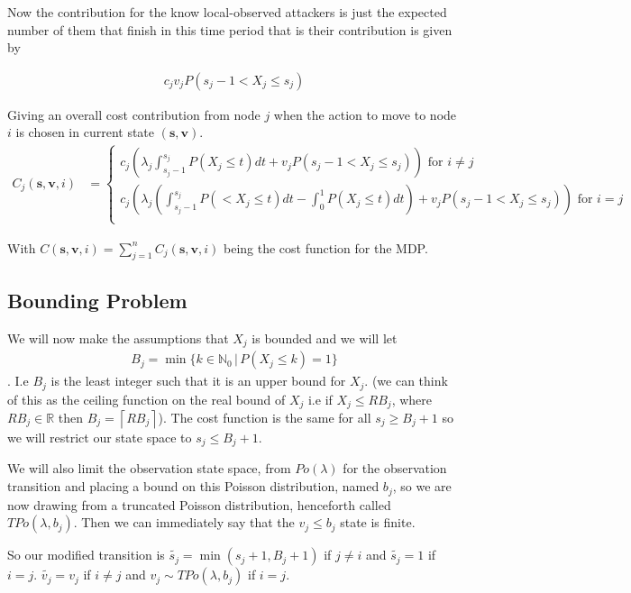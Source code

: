\documentclass[a4paper,10pt]{article}
\newcommand{\ceil}[1]{\left \lceil #1 \right \rceil}
\theoremstyle{definition}
\theoremstyle{definition}
\theoremstyle{remark}
\theoremstyle{definition}
\begin{document}
Now the contribution for the know local-observed attackers is just the expected number of them that finish in this time period that is their contribution is given by

\begin{align*}
c_{j} v_{j} P(s_{j}-1 < X_{j} \leq s_{j})
\end{align*}


Giving an overall cost contribution from node $j$ when the action to move to node $i$ is chosen in current state $(\bm{s},\bm{v})$.
\begin{align}
C_{j}(\bm{s},\bm{v},i)&= \begin{cases}
c_{j} (\lambda_{j} \int_{s_{j}-1}^{s_{j}} P(X_{j} \leq t) dt + v_{j} P(s_{j}-1 < X_{j} \leq s_{j})) \text{ for } i \neq j \\
c_{j} (\lambda_{j} (\int_{s_{j}-1}^{s_{j}} P(< X_{j} \leq t) dt - \int_{0}^{1} P(X_{j} \leq t) dt)+v_{j} P(s_{j}-1 < X_{j} \leq s_{j}))  \text{ for } i=j \\
\end{cases} 
\end{align}
   
With $C(\bm{s},\bm{v},i)=\sum\limits_{j=1}^{n} C_{j}(\bm{s},\bm{v},i)$ being the cost function for the MDP.

\subsection{Bounding Problem}
We will now make the assumptions that $X_{j}$ is bounded and we will let
\begin{align*}
B_{j}=\min \{k \in \mathbb{N}_{0} \, | \, P(X_{j} \leq k)=1 \}
\end{align*}.
I.e $B_{j}$ is the least integer such that it is an upper bound for $X_{j}$. (we can think of this as the ceiling function on the real bound of  $X_{j}$ i.e if $X_{j} \leq RB_{j}$, where $RB_{j} \in \mathbb{R}$ then $B_{j}=\ceil{RB_{j}}$).
The cost function is the same for all $s_{j} \geq B_{j}+1$ so we will restrict our state space to $s_{j} \leq B_{j}+1$.

We will also limit the observation state space, from $Po(\lambda)$ for the observation transition and placing a bound on this Poisson distribution, named $b_{j}$, so we are now drawing from a truncated Poisson distribution, henceforth called $TPo(\lambda,b_{j})$. Then we can immediately say that the $v_{j} \leq b_{j}$ state is finite.

So our modified transition is $\widetilde{s_{j}}=\min(s_{j}+1,B_{j}+1)$ if $j \neq i$ and $\widetilde{s_{j}}=1$ if $i=j$. $\widetilde{v_{j}}=v_{j}$ if $i \neq j$ and $v_{j} \sim TPo(\lambda,b_{j})$ if $i=j$.
\end{document}
